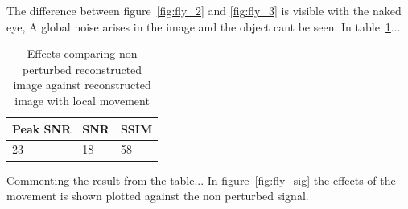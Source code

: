 The difference between figure~\ref{fig:fly_2} and \ref{fig:fly_3} is visible with the naked eye, A global noise arises in the image and the object cant be seen. In table~\ref{tab:fly_dyn}...


\begin{table}[H]
    \centering
  \begin{tabular}{ | l | l | l |}
    \hline
    Peak SNR & SNR & SSIM \\ \hline
    23 & 18 & 58 \\ 
    \hline
  \end{tabular}
      \caption{Effects comparing non perturbed reconstructed image against reconstructed image with local movement}
    \label{tab:fly_dyn}
\end{table}


Commenting the result from the table... In figure~\ref{fig:fly_sig} the effects of the movement is shown plotted against the non perturbed signal.\\[0.1in]


